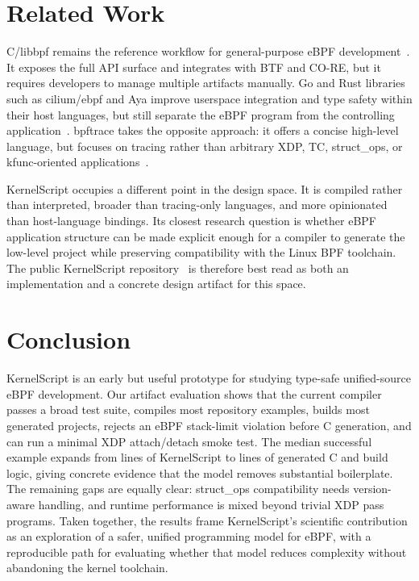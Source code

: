 \documentclass[10pt,twocolumn]{article}
\newcommand{\tool}{KernelScript}
\begin{document}
\section{Related Work}

C/libbpf remains the reference workflow for general-purpose eBPF development~\cite{libbpf}.
It exposes the full API surface and integrates with BTF and CO-RE, but it
requires developers to manage multiple artifacts manually.  Go and Rust
libraries such as cilium/ebpf and Aya improve userspace integration and type
safety within their host languages, but still separate the eBPF program from
the controlling application~\cite{aya,cilium-ebpf}.  bpftrace takes the opposite approach: it offers
a concise high-level language, but focuses on tracing rather than arbitrary
XDP, TC, struct\_ops, or kfunc-oriented applications~\cite{bpftrace}.

\tool{} occupies a different point in the design space.  It is compiled rather
than interpreted, broader than tracing-only languages, and more opinionated
than host-language bindings.  Its closest research question is whether eBPF
application structure can be made explicit enough for a compiler to generate
the low-level project while preserving compatibility with the Linux BPF
toolchain.  The public \tool{} repository~\cite{kernelscript} is therefore
best read as both an implementation and a concrete design artifact for this
space.

\section{Conclusion}

\tool{} is an early but useful prototype for studying type-safe unified-source
eBPF development.  Our artifact evaluation shows that the current compiler
passes a broad test suite, compiles most repository examples, builds most
generated projects, rejects an eBPF stack-limit violation before C generation,
and can run a minimal XDP attach/detach smoke test.  The median successful
example expands from \KSMedianKSSloc{} lines of \tool{} to
\KSMedianGeneratedSloc{} lines of generated C and build logic, giving concrete
evidence that the model removes substantial boilerplate.  The remaining gaps
are equally clear: struct\_ops compatibility needs version-aware handling, and
runtime performance is mixed beyond trivial XDP pass programs.  Taken together,
the results frame \tool{}'s scientific contribution as an exploration of a
safer, unified programming model for eBPF, with a reproducible path for
evaluating whether that model reduces complexity without abandoning the kernel
toolchain.



\end{document}
